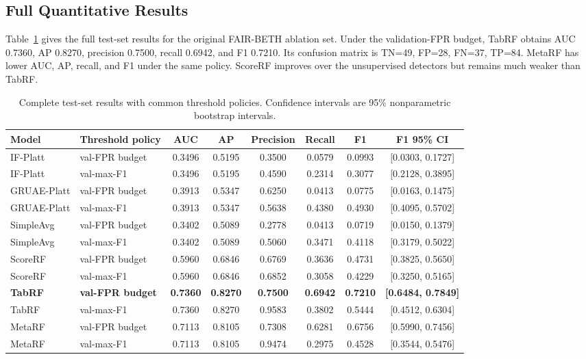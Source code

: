 \documentclass[journal]{IEEEtran}
\begin{document}
\subsection{Full Quantitative Results}

Table~\ref{tab:full_results} gives the full test-set results for the original FAIR-BETH ablation set. Under the validation-FPR budget, TabRF obtains AUC 0.7360, AP 0.8270, precision 0.7500, recall 0.6942, and F1 0.7210. Its confusion matrix is TN=49, FP=28, FN=37, TP=84. MetaRF has lower AUC, AP, recall, and F1 under the same policy. ScoreRF improves over the unsupervised detectors but remains much weaker than TabRF.

\begin{table}[t]
\centering
\caption{Complete test-set results with common threshold policies. Confidence intervals are 95\% nonparametric bootstrap intervals.}
\label{tab:full_results}
\begin{tabular}{llcccccc}
\toprule
\textbf{Model} & \textbf{Threshold policy} & \textbf{AUC} & \textbf{AP} & \textbf{Precision} & \textbf{Recall} & \textbf{F1} & \textbf{F1 95\% CI} \\
\midrule
IF-Platt & val-FPR budget & 0.3496 & 0.5195 & 0.3500 & 0.0579 & 0.0993 & [0.0303, 0.1727] \\
IF-Platt & val-max-F1 & 0.3496 & 0.5195 & 0.4590 & 0.2314 & 0.3077 & [0.2128, 0.3895] \\
GRUAE-Platt & val-FPR budget & 0.3913 & 0.5347 & 0.6250 & 0.0413 & 0.0775 & [0.0163, 0.1475] \\
GRUAE-Platt & val-max-F1 & 0.3913 & 0.5347 & 0.5638 & 0.4380 & 0.4930 & [0.4095, 0.5702] \\
SimpleAvg & val-FPR budget & 0.3402 & 0.5089 & 0.2778 & 0.0413 & 0.0719 & [0.0150, 0.1379] \\
SimpleAvg & val-max-F1 & 0.3402 & 0.5089 & 0.5060 & 0.3471 & 0.4118 & [0.3179, 0.5022] \\
ScoreRF & val-FPR budget & 0.5960 & 0.6846 & 0.6769 & 0.3636 & 0.4731 & [0.3825, 0.5650] \\
ScoreRF & val-max-F1 & 0.5960 & 0.6846 & 0.6852 & 0.3058 & 0.4229 & [0.3250, 0.5165] \\
\textbf{TabRF} & \textbf{val-FPR budget} & \textbf{0.7360} & \textbf{0.8270} & \textbf{0.7500} & \textbf{0.6942} & \textbf{0.7210} & \textbf{[0.6484, 0.7849]} \\
TabRF & val-max-F1 & 0.7360 & 0.8270 & 0.9583 & 0.3802 & 0.5444 & [0.4512, 0.6304] \\
MetaRF & val-FPR budget & 0.7113 & 0.8105 & 0.7308 & 0.6281 & 0.6756 & [0.5990, 0.7456] \\
MetaRF & val-max-F1 & 0.7113 & 0.8105 & 0.9474 & 0.2975 & 0.4528 & [0.3544, 0.5476] \\
\bottomrule
\end{tabular}
\end{table}
\end{document}
